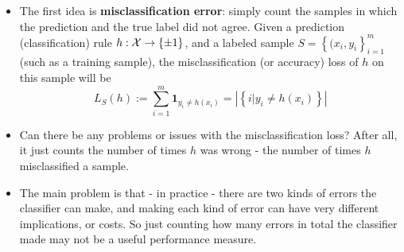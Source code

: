 \documentclass[11pt]{article}
\begin{document}
  \begin{itemize}
    \item The first idea is {\bf misclassification error}: simply count the
      samples in which the prediction and the true label did not agree. 
      Given a prediction (classification) rule $h:\mathcal{X}\to \left\{ \pm 1
      \right\}$, and a labeled sample $S=\left\{ (x_i,y_i \right\}_{i=1}^m$ (such as a
	training sample), the misclassification (or accuracy) 
	loss of $h$ on this sample will be 
	\[
	  L_S(h) := \sum_{i=1}^m \mathbf{1}_{y_i\neq h(x_i)} = 
	  |\left\{ i|y_i \neq h(x_i) \right\}|
	\]
      \item Can there be any problems or issues with the misclassification loss?
	After all, it just counts the number of times $h$ was  wrong - the number
	of times $h$ misclassified a sample. 
      \item The main problem is that - in practice - there are two kinds of
	errors the classifier can make, and making each kind of error can have
	very different implications, or costs. So just counting how many errors
	in total the classifier made may not be a useful performance measure. 
         \end{itemize}
\end{document}
